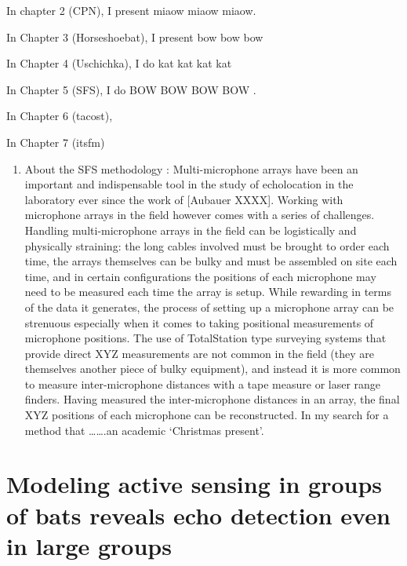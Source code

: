\documentclass[
]{book}
\providecommand{\tightlist}{%
  \setlength{\itemsep}{0pt}\setlength{\parskip}{0pt}}
\begin{document}
In chapter 2 (CPN), I present miaow miaow miaow.

In Chapter 3 (Horseshoebat), I present bow bow bow

In Chapter 4 (Uschichka), I do kat kat kat kat

In Chapter 5 (SFS), I do BOW BOW BOW BOW .

In Chapter 6 (tacost),

In Chapter 7 (itsfm)

\begin{enumerate}
\def\labelenumi{\arabic{enumi}.}
\tightlist
\item
  About the SFS methodology : Multi-microphone arrays have been an important and indispensable tool in the study of echolocation in the laboratory ever since the work of {[}Aubauer XXXX{]}. Working with microphone arrays in the field however comes with a series of challenges. Handling multi-microphone arrays in the field can be logistically and physically straining: the long cables involved must be brought to order each time, the arrays themselves can be bulky and must be assembled on site each time, and in certain configurations the positions of each microphone may need to be measured each time the array is setup. While rewarding in terms of the data it generates, the process of setting up a microphone array can be strenuous especially when it comes to taking positional measurements of microphone positions. The use of TotalStation type surveying systems that provide direct XYZ measurements are not common in the field (they are themselves another piece of bulky equipment), and instead it is more common to measure inter-microphone distances with a tape measure or laser range finders. Having measured the inter-microphone distances in an array, the final XYZ positions of each microphone can be reconstructed. In my search for a method that \ldots\ldots.an academic `Christmas present'.
\end{enumerate}

\hypertarget{modeling-active-sensing-in-groups-of-bats-reveals-echo-detection-even-in-large-groups}{%
\chapter{Modeling active sensing in groups of bats reveals echo detection even in large groups}\label{modeling-active-sensing-in-groups-of-bats-reveals-echo-detection-even-in-large-groups}}

\end{document}
